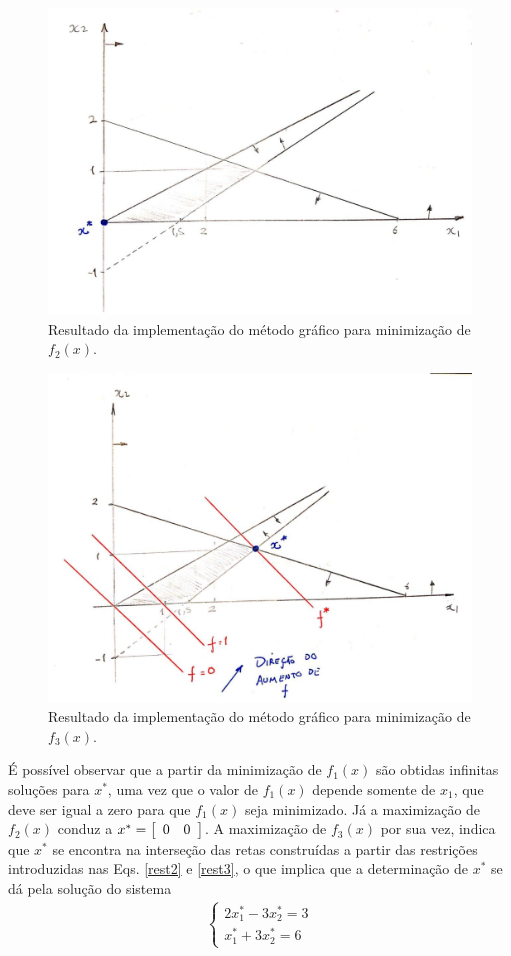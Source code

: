 \documentclass[12pt]{article}
\begin{document}
	\begin{figure}[H]
		\centering
		\includegraphics[width=0.8\linewidth]{figuras/2.jpeg}
		\caption{Resultado da implementação do método gráfico para minimização de $ f_2(x) $. }
		\label{f2Img}
	\end{figure}

	\begin{figure}[H]
		\centering
		\includegraphics[width=0.8\linewidth]{figuras/3.jpeg}
		\caption{Resultado da implementação do método gráfico para minimização de $ f_3(x) $. }
		\label{f3Img}
	\end{figure}
	
	É possível observar que a partir da minimização de $ f_1(x) $ são obtidas infinitas soluções para $ x^* $, uma vez que o valor de $ f_1(x) $ depende somente de $ x_1 $, que deve ser igual a zero para que $ f_1(x) $ seja minimizado. Já a maximização de $ f_2(x) $ conduz a $ x^* = \left[ \begin{array}{c c} 0 & 0 \end{array} \right] $. A maximização de $ f_3(x) $ por sua vez, indica que $ x^* $ se encontra na interseção das retas construídas a partir das restrições introduzidas nas Eqs. \ref{rest2} e \ref{rest3}, o que implica que a determinação de $ x^* $ se dá pela solução do sistema 
	\begin{eqnarray}
		\begin{cases}
			2 x_1^* - 3 x_2^* = 3 \\
			x_1^* + 3 x_2^* = 6
		\end{cases}
	\end{eqnarray}
 	
\end{document}
